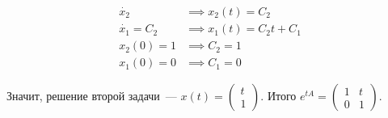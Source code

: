 \begin{exmp}
    \begin{align*}
        \dot{x_2} &\implies x_2(t) = C_2 \\
        \dot{x_1} = C_2 &\implies x_1(t) = C_2 t + C_1 \\
        x_2(0) = 1 &\implies C_2 = 1 \\
        x_1(0) = 0 &\implies C_1 = 0
    \end{align*}

    Значит, решение второй задачи~---
    $x(t) = \left( \begin{matrix}
        t \\
        1
    \end{matrix} \right)$.
    Итого $e^{tA} = \left( \begin{matrix}
        1 & t \\
        0 & 1
    \end{matrix} \right)$.
\end{exmp}


